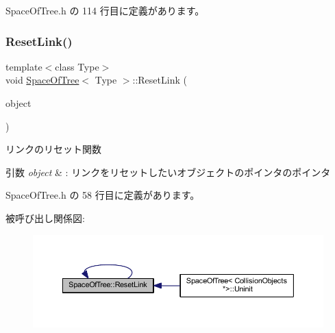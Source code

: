  Space\+Of\+Tree.\+h の 114 行目に定義があります。

\mbox{\label{class_space_of_tree_a3231408434cb3066768cfd9d33d86190}} 
\subsubsection{\texorpdfstring{Reset\+Link()}{ResetLink()}}
{\footnotesize\ttfamily template$<$class Type$>$ \\
void \mbox{\hyperlink{class_space_of_tree}{Space\+Of\+Tree}}$<$ Type $>$\+::Reset\+Link (\begin{DoxyParamCaption}\item[{\mbox{\hyperlink{class_object_of_tree}{Object\+Of\+Tree}}$<$ Type $>$ $\ast$$\ast$}]{object }\end{DoxyParamCaption})\hspace{0.3cm}{\ttfamily [inline]}}



リンクのリセット関数 


\begin{DoxyParams}{引数}
{\em object} & \+: リンクをリセットしたいオブジェクトのポインタのポインタ \\
\hline
\end{DoxyParams}


 Space\+Of\+Tree.\+h の 58 行目に定義があります。

被呼び出し関係図\+:\nopagebreak
\begin{figure}[H]
\begin{center}
\leavevmode
\includegraphics[width=350pt]{class_space_of_tree_a3231408434cb3066768cfd9d33d86190_icgraph}
\end{center}
\end{figure}
\mbox{\label{class_space_of_tree_a43844bf7bfbf0d021b9ae4708cb2e6f4}} 
